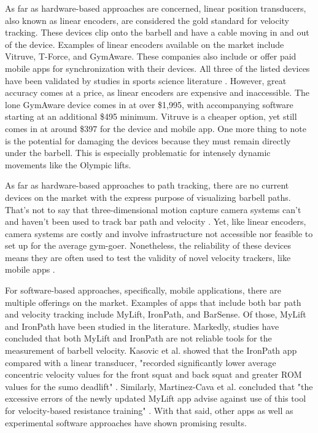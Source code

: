 \documentclass[10pt,twocolumn]{article}
\begin{document}
As far as hardware-based approaches are concerned, linear position transducers, also known as linear encoders, are considered the gold standard for velocity tracking.
These devices clip onto the barbell and have a cable moving in and out of the device.
Examples of linear encoders available on the market include Vitruve, T-Force, and GymAware. 
These companies also include or offer paid mobile apps for synchronization with their devices.
All three of the listed devices have been validated by studies in sports science literature \cite{Martinez-Cava2020, Wadhi2018, PerezCastilla2019}.
However, great accuracy comes at a price, as linear encoders are expensive and inaccessible.
The lone GymAware device comes in at over \$1,995, with accompanying software starting at an additional \$495 minimum.
Vitruve is a cheaper option, yet still comes in at around \$397 for the device and mobile app. 
One more thing to note is the potential for damaging the devices because they must remain directly under the barbell.
This is especially problematic for intensely dynamic movements like the Olympic lifts.\par

As far as hardware-based approaches to path tracking, there are no current devices on the market with the express purpose of visualizing barbell paths.
That's not to say that three-dimensional motion capture camera systems can't and haven't been used to track bar path and velocity \cite{PerezCastilla2019}.
Yet, like linear encoders, camera systems are costly and involve infrastructure not accessible nor feasible to set up for the average gym-goer.
Nonetheless, the reliability of these devices means they are often used to test the validity of novel velocity trackers, like mobile apps \cite{PerezCastilla2019}. \par

For software-based approaches, specifically, mobile applications, there are multiple offerings on the market.
Examples of apps that include both bar path and velocity tracking include MyLift, IronPath, and BarSense.
Of those, MyLift and IronPath have been studied in the literature.
Markedly, studies have concluded that both MyLift and IronPath are not reliable tools for the measurement of barbell velocity.
Kasovic et al. showed that the IronPath app compared with a linear transducer, "recorded significantly lower average concentric velocity values for the front squat and back squat and greater ROM values for the sumo deadlift" \cite{Kasovic2021}.
Similarly, Martinez-Cava et al. concluded that "the excessive errors of the newly updated MyLift app advise against use of this tool for velocity-based resistance training" \cite{Martinez-Cava2020}.
With that said, other apps as well as experimental software approaches have shown promising results. \par
\end{document}
